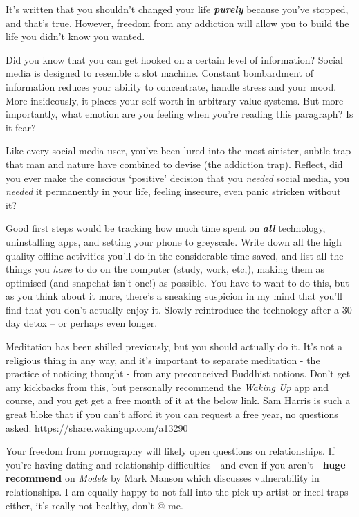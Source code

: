 \documentclass[
]{book}
\begin{document}
It's written that you shouldn't changed your life \textbf{\emph{purely}} because you've stopped, and that's true. However, freedom from any addiction will allow you to build the life you didn't know you wanted.

Did you know that you can get hooked on a certain level of information? Social media is designed to resemble a slot machine. Constant bombardment of information reduces your ability to concentrate, handle stress and your mood. More insideously, it places your self worth in arbitrary value systems. But more importantly, what emotion are you feeling when you're reading this paragraph? Is it fear?

Like every social media user, you've been lured into the most sinister, subtle trap that man and nature have combined to devise (the addiction trap). Reflect, did you ever make the conscious `positive' decision that you \emph{needed} social media, you \emph{needed} it permanently in your life, feeling insecure, even panic stricken without it?

Good first steps would be tracking how much time spent on \textbf{\emph{all}} technology, uninstalling apps, and setting your phone to greyscale. Write down all the high quality offline activities you'll do in the considerable time saved, and list all the things you \emph{have} to do on the computer (study, work, etc,), making them as optimised (and snapchat isn't one!) as possible. You have to want to do this, but as you think about it more, there's a sneaking suspicion in my mind that you'll find that you don't actually enjoy it. Slowly reintroduce the technology after a 30 day detox -- or perhaps even longer.

Meditation has been shilled previously, but you should actually do it. It's not a religious thing in any way, and it's important to separate meditation - the practice of noticing thought - from any preconceived Buddhist notions.
Don't get any kickbacks from this, but personally recommend the \emph{Waking Up} app and course, and you get get a free month of it at the below link. Sam Harris is such a great bloke that if you can't afford it you can request a free year, no questions asked.
\url{https://share.wakingup.com/a13290}

Your freedom from pornography will likely open questions on relationships. If you're having dating and relationship difficulties - and even if you aren't - \textbf{huge recommend} on \emph{Models} by Mark Manson which discusses vulnerability in relationships. I am equally happy to not fall into the pick-up-artist or incel traps either, it's really not healthy, don't @ me.
\end{document}

